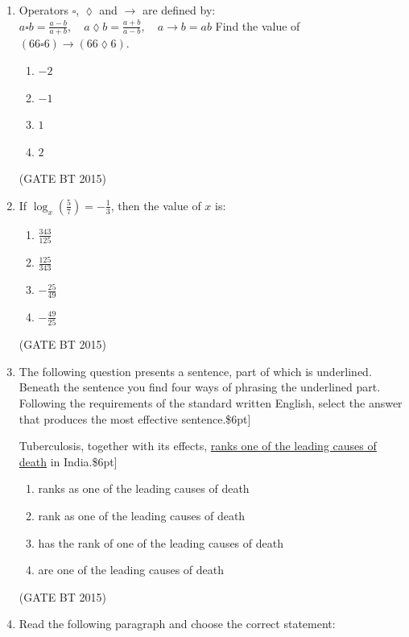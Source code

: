 \documentclass[journal,12pt,onecolumn]{IEEEtran}
\begin{document}
\begin{enumerate}[label=\textbf{Q.\arabic*}]
    \item Operators $\square$, $\lozenge$ and $\rightarrow$ are defined by:  
    $
    a \square b = \frac{a - b}{a + b}, \quad a \lozenge b = \frac{a + b}{a - b}, \quad a \rightarrow b = ab
    $
    Find the value of $(66 \square 6) \rightarrow (66 \lozenge 6)$.
    \begin{multicols}{4}
    \begin{enumerate}
        \item $-2$
        \item $-1$
        \item $1$
        \item $2$
    \end{enumerate}
    \end{multicols}             \hfill (GATE BT 2015)

   
    \item If $\log_x \left(\frac{5}{7}\right) = -\frac{1}{3}$, then the value of $x$ is:
    \begin{enumerate}
        \item $\frac{343}{125}$  
        \item $\frac{125}{343}$  
        \item $-\frac{25}{49}$  
        \item $-\frac{49}{25}$  
    \end{enumerate}
    \hfill (GATE BT 2015)


  \item The following question presents a sentence, part of which is underlined. 
  Beneath the sentence you find four ways of phrasing the underlined part. 
  Following the requirements of the standard written English, 
  select the answer that produces the most effective sentence.\$6pt]
  
  Tuberculosis, together with its effects, 
  \underline{ranks one of the leading causes of death} in India.\$6pt]
  
  \begin{enumerate}
    \item ranks as one of the leading causes of death
    \item rank as one of the leading causes of death
    \item has the rank of one of the leading causes of death
    \item are one of the leading causes of death
  \end{enumerate}
  \hfill (GATE BT 2015)


    \item Read the following paragraph and choose the correct statement:


\end{enumerate}
\end{document}
